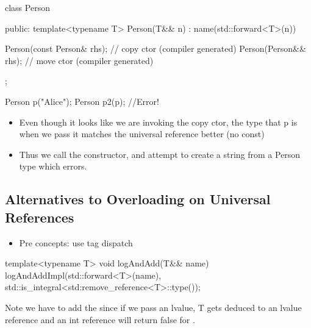 \begin{cppcode}
class Person {
public:
  template<typename T>
  Person(T&& n) : name(std::forward<T>(n)) {}
  
  Person(const Person& rhs); // copy ctor (compiler generated)
  Person(Person&& rhs); // move ctor (compiler generated)
};

Person p("Alice");
Person p2(p); //Error!
\end{cppcode}
\begin{itemize}
  \item Even though it looks like we are invoking the copy ctor, the type that p is when we pass it  matches the universal reference better (no const)
  \item Thus we call the constructor, and attempt to create a string from a Person type which errors.
\end{itemize}
\subsection{Alternatives to Overloading on Universal References}
\begin{itemize}
  \item Pre concepts: use tag dispatch
\end{itemize}
\begin{cppcode}
template<typename T>
void logAndAdd(T&& name) {
  logAndAddImpl(std::forward<T>(name), std::is_integral<std:remove_reference<T>::type());
}
\end{cppcode}
Note we have to add the  since if we pass an lvalue, T gets deduced to an lvalue reference and an int reference will return false for .

